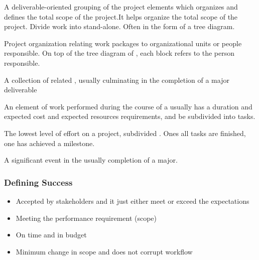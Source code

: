\documentclass[english, 11pt]{article}
\begin{document}
\begin{defn}\label{wbs}
A deliverable-oriented grouping of the project elements which organizes and defines the total scope of the project.It helps organize the total scope of the project. Divide work into stand-alone. Often in the form of a tree diagram.
\end{defn}

\begin{defn}\label{obs}
Project organization relating work packages to organizational units or people responsible. On top of the tree diagram of , each block refers to the person responsible.
\end{defn}

\begin{defn}\label{project phase}
A collection of related , usually culminating in the completion of a major deliverable
\end{defn}

\begin{defn}[Activity]\label{activity}
An element of work performed during the course of a  usually has a duration and expected cost and expected resources requirements, and be subdivided into tasks.
\end{defn}

\begin{defn}[Task]\label{task}
The lowest level of effort on a project, subdivided . Ones all tasks are finished, one has achieved a milestone.
\end{defn}

\begin{defn}[Milestone]\label{milestone}
A significant event in the  usually completion of a major.
\end{defn}

\subsubsection{Defining Success}

\begin{itemize}
  \item Accepted by stakeholders and it just either meet or exceed the expectations
  \item Meeting the performance requirement (scope)
  \item On time and in budget
  \item Minimum change in scope and does not corrupt workflow
\end{itemize}
\end{document}
